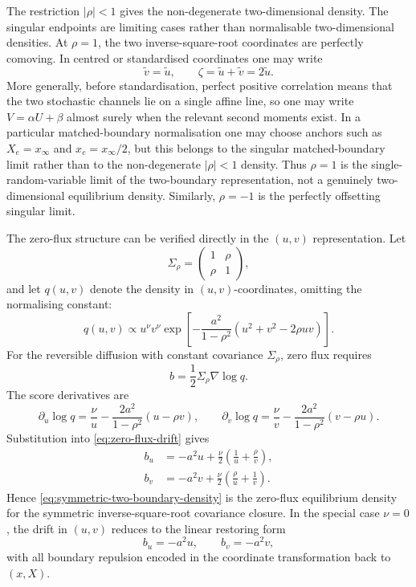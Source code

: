 \documentclass[11pt]{article}
\numberwithin{equation}{section}
\begin{document}
The restriction \(|\rho|<1\) gives the non-degenerate two-dimensional density. The singular endpoints are limiting cases rather than normalisable two-dimensional densities. At \(\rho=1\), the two inverse-square-root coordinates are perfectly comoving. In centred or standardised coordinates one may write
\begin{equation}
\label{eq:rho-one-collapse}
        \widetilde v=\widetilde u,
        \qquad
        \zeta=\widetilde u+\widetilde v=2\widetilde u .
\end{equation}
More generally, before standardisation, perfect positive correlation means that the two stochastic channels lie on a single affine line, so one may write \(V=\alpha U+\beta\) almost surely when the relevant second moments exist. In a particular matched-boundary normalisation one may choose anchors such as \(X_e=x_\infty\) and \(x_e=x_\infty/2\), but this belongs to the singular matched-boundary limit rather than to the non-degenerate \(|\rho|<1\) density. Thus \(\rho=1\) is the single-random-variable limit of the two-boundary representation, not a genuinely two-dimensional equilibrium density. Similarly, \(\rho=-1\) is the perfectly offsetting singular limit.

The zero-flux structure can be verified directly in the \((u,v)\) representation. Let
\[
\Sigma_{\rho}=
\begin{pmatrix}
1 & \rho\\
\rho & 1
\end{pmatrix},
\]
and let \(q(u,v)\) denote the density in \((u,v)\)-coordinates, omitting the normalising constant:
\[
q(u,v)
\propto
u^{\nu}v^{\nu}
\exp\left[
-\frac{a^2}{1-\rho^2}
\left(u^2+v^2-2\rho uv\right)
\right].
\]
For the reversible diffusion with constant covariance \(\Sigma_\rho\), zero flux requires
\begin{equation}
\label{eq:zero-flux-drift}
b=\frac12\Sigma_\rho\nabla\log q .
\end{equation}
The score derivatives are
\[
\partial_u\log q
=
\frac{\nu}{u}
-
\frac{2a^2}{1-\rho^2}(u-\rho v),
\qquad
\partial_v\log q
=
\frac{\nu}{v}
-
\frac{2a^2}{1-\rho^2}(v-\rho u).
\]
Substitution into \eqref{eq:zero-flux-drift} gives
\begin{align}
\label{eq:zero-flux-bu}
b_u
&=
-a^2u
+
\frac{\nu}{2}\left(\frac1u+\frac{\rho}{v}\right),\\
\label{eq:zero-flux-bv}
b_v
&=
-a^2v
+
\frac{\nu}{2}\left(\frac{\rho}{u}+\frac1v\right).
\end{align}
Hence \eqref{eq:symmetric-two-boundary-density} is the zero-flux equilibrium density for the symmetric inverse-square-root covariance closure. In the special case \(\nu=0\), the drift in \((u,v)\) reduces to the linear restoring form
\[
b_u=-a^2u,
\qquad
b_v=-a^2v,
\]
with all boundary repulsion encoded in the coordinate transformation back to \((x,X)\).
\end{document}
